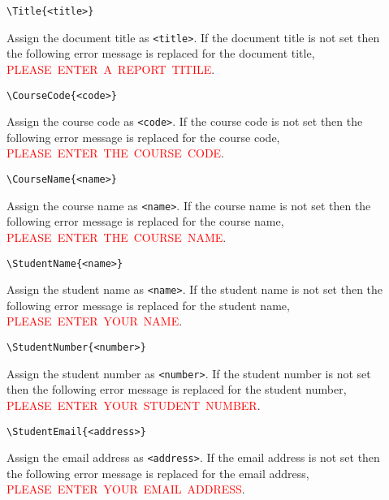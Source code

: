 \documentclass[10pt, a4paper, oneside]{article}
\begin{document}
\begin{description}
    \item[\hspace{-1em}]{\lstinline|\Title{<title>}| }
        \par{Assign the document title as \lstinline{<title>}.  If the document title is not set then the following error message is replaced for the document title, \textcolor{red}{PLEASE~ENTER~A~REPORT~TITILE}.}
    \item[\hspace{-1em}]{\lstinline|\CourseCode{<code>}| }
        \par{Assign the course code as \lstinline{<code>}.  If the course code is not set then the following error message is replaced for the course code, \textcolor{red}{PLEASE~ENTER~THE~COURSE~CODE}.}
    \item[\hspace{-1em}]{\lstinline|\CourseName{<name>}| }
        \par{Assign the course name as \lstinline{<name>}.  If the course name is not set then the following error message is replaced for the course name, \textcolor{red}{PLEASE~ENTER~THE~COURSE~NAME}.}
    \item[\hspace{-1em}]{\lstinline|\StudentName{<name>}| }
        \par{Assign the student name as \lstinline{<name>}.  If the student name is not set then the following error message is replaced for the student name, \textcolor{red}{PLEASE~ENTER~YOUR~NAME}.}
    \item[\hspace{-1em}]{\lstinline|\StudentNumber{<number>}| }
        \par{Assign the student number as \lstinline{<number>}.  If the student number is not set then the following error message is replaced for the student number, \textcolor{red}{PLEASE~ENTER~YOUR~STUDENT~NUMBER}.}
    \item[\hspace{-1em}]{\lstinline|\StudentEmail{<address>}| }
        \par{Assign the email address as \lstinline{<address>}.  If the email address is not set then the following error message is replaced for the email address, \textcolor{red}{PLEASE~ENTER~YOUR~EMAIL~ADDRESS}.}
\end{description}
\end{document}
